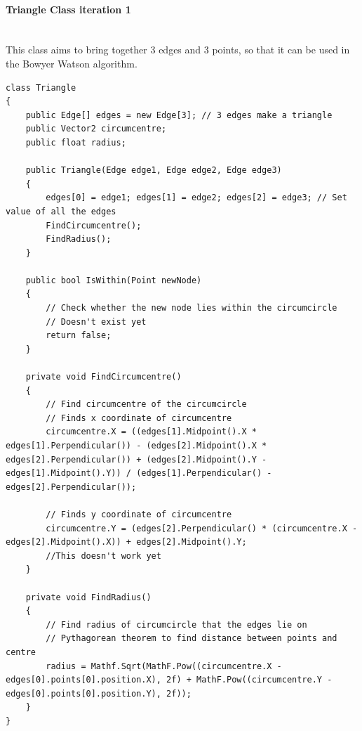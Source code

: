 \documentclass{article}
\newcommand{\myparagraph}[1]{\paragraph{#1}\mbox{}\\} %
\begin{document}
\myparagraph{Triangle Class iteration 1}
This class aims to bring together 3 edges and 3 points, so that it can be used in the Bowyer Watson algorithm.
\begin{lstlisting}
class Triangle
{
    public Edge[] edges = new Edge[3]; // 3 edges make a triangle
    public Vector2 circumcentre;
    public float radius;

    public Triangle(Edge edge1, Edge edge2, Edge edge3)
    {
        edges[0] = edge1; edges[1] = edge2; edges[2] = edge3; // Set value of all the edges
        FindCircumcentre();
        FindRadius();
    }

    public bool IsWithin(Point newNode)
    {
        // Check whether the new node lies within the circumcircle
        // Doesn't exist yet
        return false;
    }

    private void FindCircumcentre()
    {
        // Find circumcentre of the circumcircle
        // Finds x coordinate of circumcentre
        circumcentre.X = ((edges[1].Midpoint().X * edges[1].Perpendicular()) - (edges[2].Midpoint().X * edges[2].Perpendicular()) + (edges[2].Midpoint().Y - edges[1].Midpoint().Y)) / (edges[1].Perpendicular() - edges[2].Perpendicular());

        // Finds y coordinate of circumcentre
        circumcentre.Y = (edges[2].Perpendicular() * (circumcentre.X - edges[2].Midpoint().X)) + edges[2].Midpoint().Y;
        //This doesn't work yet
    }

    private void FindRadius()
    {
        // Find radius of circumcircle that the edges lie on
        // Pythagorean theorem to find distance between points and centre
        radius = Mathf.Sqrt(MathF.Pow((circumcentre.X - edges[0].points[0].position.X), 2f) + MathF.Pow((circumcentre.Y - edges[0].points[0].position.Y), 2f));
    }
}

\end{lstlisting}
\end{document}
